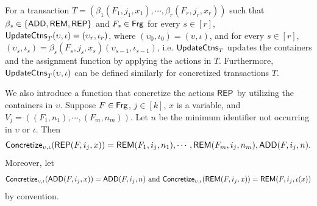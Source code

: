 For a  transaction $T=(\beta_1(F_1, j_1, x_1), \cdots, \beta_{r}(F_r, j_r, x_r))$ such that $\beta_s \in \{\mathsf{ADD},\mathsf{REM},\mathsf{REP}\}$ and $F_s \in {\sf Frg}$ for every $s \in [r]$, 
 $\mathsf{UpdateCtns}_T(\upsilon, \iota)= (\upsilon_r, \iota_r)$, where $(\upsilon_0, \iota_0) = (\upsilon, \iota)$, and for every $s \in [r]$, $(\upsilon_s, \iota_s) = \beta_s(F_s, j_s, x_s)(\upsilon_{s-1}, \iota_{s-1})$, i.e. $\mathsf{UpdateCtns}_T$ updates the containers and the assignment function by applying the actions in $T$. Furthermore, $\mathsf{UpdateCtns}_T(\upsilon, \iota)$ can be defined similarly for concretized transactions $T$.


%    
  
%
%

We also introduce a function that concretize the actions $\mathsf{REP}$ by utilizing the containers in $\upsilon$. Suppose $F \in {\sf Frg}$, $j \in [k]$, $x$ is a variable, and $V_j = ((F_1, n_1), \cdots, (F_{m}, n_m))$. Let $n$ be the minimum identifier not occurring in $\upsilon$ or $\iota$.
Then
$$
\mathsf{Concretize}_{\upsilon, \iota}(\mathsf{REP}(F, i_j, x)) =
\mathsf{REM}(F_{1}, i_j, n_1), \cdots, \mathsf{REM}(F_{m}, i_j, n_m), \mathsf{ADD}(F, i_j, n).
$$
%
%
Moreover, let 
$$\mathsf{Concretize}_{\upsilon,\iota}(\mathsf{ADD}(F, i_j, x)) = \mathsf{ADD}(F, i_j, n) \mbox{ and } \mathsf{Concretize}_{\upsilon,\iota}(\mathsf{REM}(F, i_j, x)) = \mathsf{REM}(F, i_j, \iota(x))$$
by convention.
%
%

